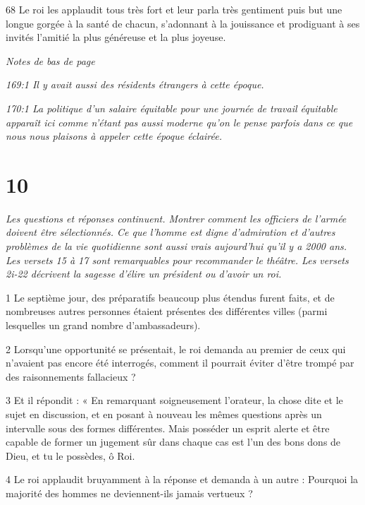 \par 68 Le roi les applaudit tous très fort et leur parla très gentiment puis but une longue gorgée à la santé de chacun, s'adonnant à la jouissance et prodiguant à ses invités l'amitié la plus généreuse et la plus joyeuse.

\par \textit{Notes de bas de page}

\par \textit{169:1 Il y avait aussi des résidents étrangers à cette époque.}

\par \textit{170:1 La politique d'un salaire équitable pour une journée de travail équitable apparaît ici comme n'étant pas aussi moderne qu'on le pense parfois dans ce que nous nous plaisons à appeler cette époque éclairée.}

\chapter{10}

\par \textit{Les questions et réponses continuent. Montrer comment les officiers de l'armée doivent être sélectionnés. Ce que l'homme est digne d'admiration et d'autres problèmes de la vie quotidienne sont aussi vrais aujourd'hui qu'il y a 2000 ans. Les versets 15 à 17 sont remarquables pour recommander le théâtre. Les versets 2i-22 décrivent la sagesse d'élire un président ou d'avoir un roi.}

\par 1 Le septième jour, des préparatifs beaucoup plus étendus furent faits, et de nombreuses autres personnes étaient présentes des différentes villes (parmi lesquelles un grand nombre d'ambassadeurs).

\par 2 Lorsqu'une opportunité se présentait, le roi demanda au premier de ceux qui n'avaient pas encore été interrogés, comment il pourrait éviter d'être trompé par des raisonnements fallacieux ?

\par 3 Et il répondit : « En remarquant soigneusement l'orateur, la chose dite et le sujet en discussion, et en posant à nouveau les mêmes questions après un intervalle sous des formes différentes. Mais posséder un esprit alerte et être capable de former un jugement sûr dans chaque cas est l'un des bons dons de Dieu, et tu le possèdes, ô Roi.

\par 4 Le roi applaudit bruyamment à la réponse et demanda à un autre : Pourquoi la majorité des hommes ne deviennent-ils jamais vertueux ?

